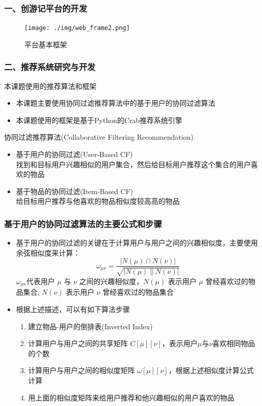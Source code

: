 \documentclass{beamer}
\begin{document}
\begin{frame}
  \frametitle{一、创游记平台的开发}
  \begin{figure}
    \centering
      \texttt{[image: ./img/web\_frame2.png]}
    \caption{平台基本框架}
    \label{fig:visual}
  \end{figure}
\end{frame}

\begin{frame}
\frametitle{二、\cite{crab1}推荐系统研究与开发}
  \begin{block}{本课题使用的推荐算法和框架}
    \begin{itemize}
      \item 本课题主要使用协同过滤推荐算法中的基于用户的协同过滤算法
      \item \cite{crab2}本课题使用的框架是基于Python的Crab推荐系统引擎
    \end{itemize}
  \end{block}
  \begin{block}{协同过滤推荐算法(Collaborative Filtering Recommendation)}
    \begin{itemize}
      \item 基于用户的协同过滤(User-Based CF)\\
      找到和目标用户兴趣相似的用户集合，然后给目标用户推荐这个集合的用户喜欢的物品
      \item 基于物品的协同过滤(Item-Based CF)\\
      给目标用户推荐与他喜欢的物品相似度较高高的物品\\
    \end{itemize}
  \end{block}
\end{frame}

\begin{frame}
\frametitle{基于用户的协同过滤算法的主要公式和步骤}
  \begin{itemize}
    \item \cite{crab3} 基于用户的协同过滤的关键在于计算用户与用户之间的兴趣相似度，主要使用余弦相似度来计算：\\
    \begin{displaymath}
    \omega_{\mu\nu} = \frac{|N(\mu) \cap N(\nu)|}{\sqrt{|N(\mu) \parallel N(\nu)|}}
    \end{displaymath}
    $\omega_{\mu\nu}$代表用户 $\mu$ 与 $ \nu $ 之间的兴趣相似度，$ {N(\mu)} $ 表示用户 $ \mu $ 曾经喜欢过的物品集合, $ {N(\nu)} $ 表示用户 $ \nu $ 曾经喜欢过的物品集合
    \item 根据上述描述，可以有如下算法步骤
      \begin{enumerate}
        \item 建立物品-用户的倒排表(Inverted Index)
        \item 计算用户与用户之间的共享矩阵 $C[\mu][\nu]$，表示用户$\mu$与$\nu$喜欢相同物品的个数
        \item 计算用户与用户之间的相似度矩阵 $\omega[\mu][\nu]$，根据上述相似度计算公式计算
        \item 用上面的相似度矩阵来给用户推荐和他兴趣相似的用户喜欢的物品
      \end{enumerate}
  \end{itemize}
\end{frame}
\end{document}
